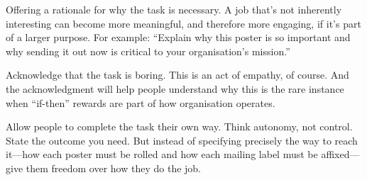 \begin{compactitem}
\item Offering a rationale for why the task is necessary. A job that’s not inherently interesting can become more meaningful, and therefore more engaging, if it’s part of a larger purpose. For example: ``Explain why this poster is so important and why sending it out now is critical to your organisation’s mission.''
\item Acknowledge that the task is boring. This is an act of empathy, of course. And the acknowledgment will help people understand why this is the rare instance when ``if-then'' rewards are part of how organisation operates.
\item Allow people to complete the task their own way. Think autonomy, not control. State the outcome you need. But instead of specifying precisely the way to reach it—how each poster must be rolled and how each mailing label must be affixed—give them freedom over how they do the job.
\end{compactitem}

